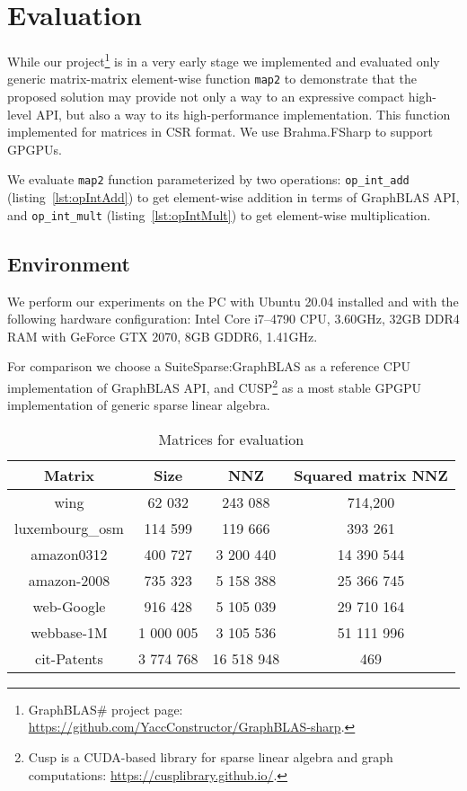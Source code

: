 \section{Evaluation}

While our project\footnote{GraphBLAS\# project page: \url{https://github.com/YaccConstructor/GraphBLAS-sharp}.} is in a very early stage we implemented and evaluated only generic matrix-matrix element-wise function \texttt{map2} to demonstrate that the proposed solution may provide not only a way to an expressive compact high-level API, but also a way to its high-performance implementation. This function implemented for matrices in CSR format. We use Brahma.FSharp to support GPGPUs.  

We evaluate \texttt{map2} function parameterized by two operations: \texttt{op\_int\_add} (listing~\ref{lst:opIntAdd}) to get element-wise addition in terms of GraphBLAS API, and \texttt{op\_int\_mult} (listing~\ref{lst:opIntMult}) to get element-wise multiplication.

\subsection{Environment}
We perform our experiments on the PC with Ubuntu 20.04 installed and with the following hardware configuration: Intel Core i7--4790 CPU, 3.60GHz, 32GB DDR4 RAM with GeForce GTX 2070, 8GB GDDR6, 1.41GHz.

For comparison we choose a SuiteSparse:GraphBLAS as a reference CPU implementation of GraphBLAS API, and CUSP\footnote{Cusp is a CUDA-based library for sparse linear algebra and graph computations: \url{https://cusplibrary.github.io/}.} as a most stable GPGPU implementation of generic sparse linear algebra.

\begin{table}[H]
    \centering
    \caption{Matrices for evaluation}
    \label{matrices}  
    \begin{tabular}{ | c || c | c | c | }
    \hline
    Matrix & Size & NNZ & Squared matrix NNZ \\ \hline
    \hline
    wing & 62 032 & 243 088 & 714,200 \\ \hline
    luxembourg\_osm & 114 599 & 119 666 & 393 261 \\ \hline
    amazon0312 & 400 727 & 3 200 440 & 14 390 544 \\ \hline
    amazon-2008 & 735 323 & 5 158 388 & 25 366 745 \\ \hline
    web-Google & 916 428 & 5 105 039 & 29 710 164 \\ \hline
    webbase-1M & 1 000 005 & 3 105 536 & 51 111 996 \\ \hline
    cit-Patents & 3 774 768 & 16 518 948 & 469 \\ \hline
    \end{tabular}
\end{table}


